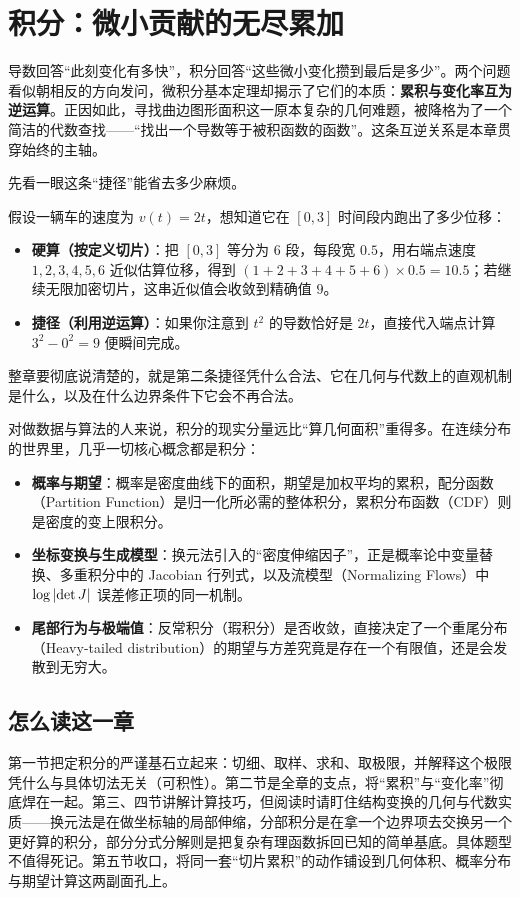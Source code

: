 \section{积分：微小贡献的无尽累加}
\label{sec:02-Calculus/04-Integration/00-Intro}

导数回答“此刻变化有多快”，积分回答“这些微小变化攒到最后是多少”。两个问题看似朝相反的方向发问，微积分基本定理却揭示了它们的本质：\textbf{累积与变化率互为逆运算}。正因如此，寻找曲边图形面积这一原本复杂的几何难题，被降格为了一个简洁的代数查找——“找出一个导数等于被积函数的函数”。这条互逆关系是本章贯穿始终的主轴。

先看一眼这条“捷径”能省去多少麻烦。

假设一辆车的速度为 $v(t)=2t$，想知道它在 $[0,3]$ 时间段内跑出了多少位移：
\begin{itemize}
\item \textbf{硬算（按定义切片）}：把 $[0,3]$ 等分为 6 段，每段宽 $0.5$，用右端点速度 $1, 2, 3, 4, 5, 6$ 近似估算位移，得到 $(1+2+3+4+5+6) \times 0.5 = 10.5$；若继续无限加密切片，这串近似值会收敛到精确值 $9$。
\item \textbf{捷径（利用逆运算）}：如果你注意到 $t^2$ 的导数恰好是 $2t$，直接代入端点计算 $3^2 - 0^2 = 9$ 便瞬间完成。
\end{itemize}
整章要彻底说清楚的，就是第二条捷径凭什么合法、它在几何与代数上的直观机制是什么，以及在什么边界条件下它会不再合法。

对做数据与算法的人来说，积分的现实分量远比“算几何面积”重得多。在连续分布的世界里，几乎一切核心概念都是积分：
\begin{itemize}
\item \textbf{概率与期望}：概率是密度曲线下的面积，期望是加权平均的累积，配分函数（Partition Function）是归一化所必需的整体积分，累积分布函数（CDF）则是密度的变上限积分。
\item \textbf{坐标变换与生成模型}：换元法引入的“密度伸缩因子”，正是概率论中变量替换、多重积分中的 Jacobian 行列式，以及流模型（Normalizing Flows）中 $\log\left|\det J\right|$ 误差修正项的同一机制。
\item \textbf{尾部行为与极端值}：反常积分（瑕积分）是否收敛，直接决定了一个重尾分布（Heavy-tailed distribution）的期望与方差究竟是存在一个有限值，还是会发散到无穷大。
\end{itemize}

\subsection{怎么读这一章}

第一节把定积分的严谨基石立起来：切细、取样、求和、取极限，并解释这个极限凭什么与具体切法无关（可积性）。第二节是全章的支点，将“累积”与“变化率”彻底焊在一起。第三、四节讲解计算技巧，但阅读时请盯住结构变换的几何与代数实质——换元法是在做坐标轴的局部伸缩，分部积分是在拿一个边界项去交换另一个更好算的积分，部分分式分解则是把复杂有理函数拆回已知的简单基底。具体题型不值得死记。第五节收口，将同一套“切片累积”的动作铺设到几何体积、概率分布与期望计算这两副面孔上。

